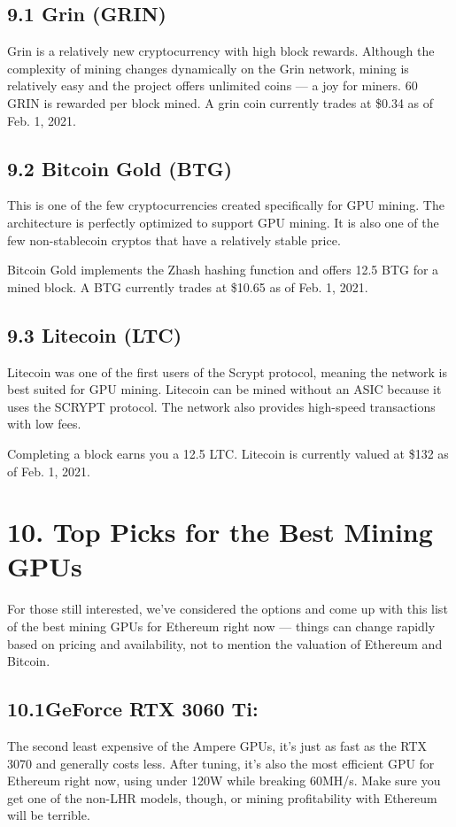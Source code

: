 \subsection*{9.1 Grin (GRIN)}
Grin is a relatively new cryptocurrency with high block rewards. Although the complexity of mining changes dynamically on the Grin network, mining is relatively easy and the project offers unlimited coins — a joy for miners. 60 GRIN is rewarded per block mined. A grin coin currently trades at \$0.34 as of Feb. 1, 2021.

\subsection*{9.2 Bitcoin Gold (BTG)}
This is one of the few cryptocurrencies created specifically for GPU mining. The architecture is perfectly optimized to support GPU mining. It is also one of the few non-stablecoin cryptos that have a relatively stable price.

Bitcoin Gold implements the Zhash hashing function and offers 12.5 BTG for a mined block. A BTG currently trades at \$10.65 as of Feb. 1, 2021.

\subsection*{9.3 Litecoin (LTC)}
Litecoin was one of the first users of the Scrypt protocol, meaning the network is best suited for GPU mining. Litecoin can be mined without an ASIC because it uses the SCRYPT protocol. The network also provides high-speed transactions with low fees.

Completing a block earns you a 12.5 LTC. Litecoin is currently valued at \$132 as of Feb. 1, 2021.

\section*{10. Top Picks for the Best Mining GPUs}
For those still interested, we've considered the options and come up with this list of the best mining GPUs for Ethereum right now — things can change rapidly based on pricing and availability, not to mention the valuation of Ethereum and Bitcoin.\vspace{.3cm}

\subsection*{10.1GeForce RTX 3060 Ti:} The second least expensive of the Ampere GPUs, it's just as fast as the RTX 3070 and generally costs less. After tuning, it's also the most efficient GPU for Ethereum right now, using under 120W while breaking 60MH/s. Make sure you get one of the non-LHR models, though, or mining profitability with Ethereum will be terrible.

